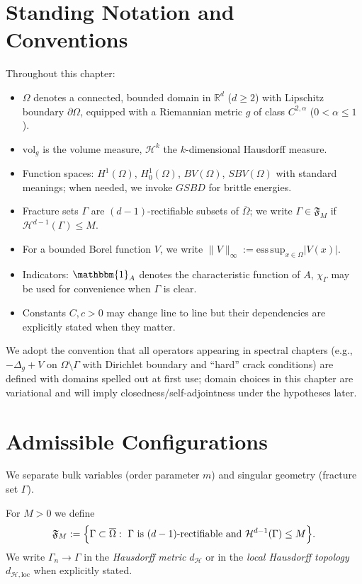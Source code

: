\section{Standing Notation and Conventions}\label{sec:notation-conventions}
Throughout this chapter:
\begin{itemize}
  \item $\Omega$ denotes a connected, bounded domain in $\mathbb{R}^d$ ($d\ge 2$) with Lipschitz boundary $\partial\Omega$, equipped with a Riemannian metric $g$ of class $C^{2,\alpha}$ ($0<\alpha\le 1$).
  \item $\mathrm{vol}_g$ is the volume measure, $\mathcal{H}^{k}$ the $k$-dimensional Hausdorff measure.
  \item Function spaces: $H^1(\Omega)$, $H^1_0(\Omega)$, $BV(\Omega)$, $SBV(\Omega)$ with standard meanings; when needed, we invoke $GSBD$ for brittle energies.
  \item Fracture sets $\Gamma$ are $(d-1)$-rectifiable subsets of $\overline{\Omega}$; we write $\Gamma\in\mathfrak{F}_M$ if $\mathcal{H}^{d-1}(\Gamma)\le M$.
  \item For a bounded Borel function $V$, we write $\|V\|_\infty:=\mathrm{ess\,sup}_{x\in\Omega}|V(x)|$.
  \item Indicators: $\mathbbm{1}_A$ denotes the characteristic function of $A$, $\chi_\Gamma$ may be used for convenience when $\Gamma$ is clear.
  \item Constants $C,c>0$ may change line to line but their dependencies are explicitly stated when they matter.
\end{itemize}

We adopt the convention that all operators appearing in spectral chapters (e.g., $-\Delta_g+V$ on $\Omega\setminus\Gamma$ with Dirichlet boundary and ``hard'' crack conditions) are defined with domains spelled out at first use; domain choices in this chapter are variational and will imply closedness/self-adjointness under the hypotheses later.

\section{Admissible Configurations}\label{sec:admissible}
We separate bulk variables (order parameter $m$) and singular geometry (fracture set $\Gamma$).

\begin{definition}\label{def:fracture-class}
For $M>0$ we define
\[
  \mathfrak{F}_M:=\Bigl\{\Gamma\subset\overline{\Omega}:\ \Gamma \text{ is }(d-1)\text{-rectifiable and } \mathcal{H}^{d-1}(\Gamma)\le M\Bigr\}.
\]
We write $\Gamma_n\to\Gamma$ in the \emph{Hausdorff metric} $d_{\mathcal{H}}$ or in the \emph{local Hausdorff topology} $d_{\mathcal{H},\mathrm{loc}}$ when explicitly stated.
\end{definition}

